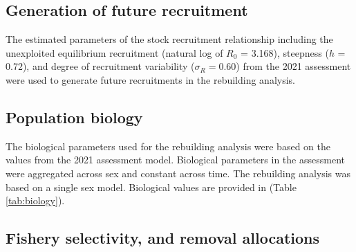 \documentclass[11pt,
  english,
  a4paper,
]{article}
\begin{document}
\leavevmode\tagmcend\tagstructend\par


\hypertarget{generation-of-future-recruitment}{%
\subsection{Generation of future recruitment}\label{generation-of-future-recruitment}}

\leavevmode\tagmcend\tagstructend


The estimated parameters of the stock recruitment relationship including the unexploited equilibrium recruitment (natural log of {\(R_0\)\leavevmode\tagmcend\tagstructend} = 3.168), steepness ({\(h\)\leavevmode\tagmcend\tagstructend} = 0.72), and degree of recruitment variability ({\(\sigma_R = 0.60\)\leavevmode\tagmcend\tagstructend}) from the 2021 assessment were used to generate future recruitments in the rebuilding analysis.

\leavevmode\tagmcend\tagstructend\par


\hypertarget{population-biology}{%
\subsection{Population biology}\label{population-biology}}

\leavevmode\tagmcend\tagstructend


The biological parameters used for the rebuilding analysis were based on the values from the 2021 assessment model. Biological parameters in the assessment were aggregated across sex and constant across time. The rebuilding analysis was based on a single sex model. Biological values are provided in (Table \ref{tab:biology}).

\leavevmode\tagmcend\tagstructend\par


\hypertarget{fishery-selectivity-and-removal-allocations}{%
\subsection{Fishery selectivity, and removal allocations}\label{fishery-selectivity-and-removal-allocations}}
\end{document}
